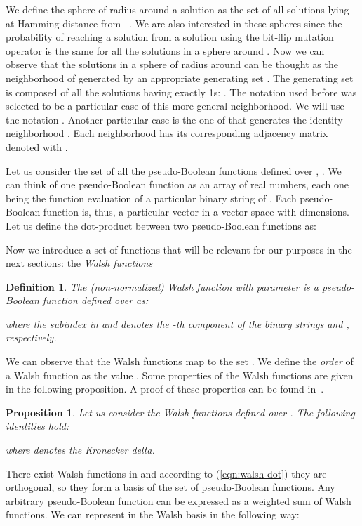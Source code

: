 \documentclass{article}
\newtheorem{definition}{Definition}
\newtheorem{proposition}{Proposition}
\begin{document}
We define the sphere of radius   around a solution  as the set of all solutions lying at Hamming distance  from ~\citep{Sutton2010}. We are also interested in these spheres since the probability of reaching a solution  from a solution  using the bit-flip mutation operator is the same for all the solutions in a sphere around . Now we can observe that the solutions in a sphere of radius  around  can be thought as the neighborhood  of  generated by an appropriate generating set . The generating set is composed of all the solutions having exactly  1s: . The notation  used before was selected to be a particular case of this more general neighborhood. We will use the notation . Another particular case is the one of  that generates the identity neighborhood . Each neighborhood has its corresponding adjacency matrix denoted with .



Let us consider the set of all the pseudo-Boolean functions defined over , . We can think of one pseudo-Boolean function as an array of  real numbers, each one being the function evaluation of a particular binary string of . Each pseudo-Boolean function is, thus, a particular vector in a vector space with  dimensions. Let us define the dot-product between two pseudo-Boolean functions as:


Now we introduce a set of functions that will be relevant for our purposes in the next sections: the \emph{Walsh functions}~\citep{Walsh1923}

\begin{definition}
The (non-normalized) Walsh function with parameter  is a pseudo-Boolean function defined over  as:

where the subindex in  and  denotes the -th component of the binary strings  and , respectively.
\end{definition}

We can observe that the Walsh functions map  to the set . We define the \emph{order} of a Walsh function  as the value . Some properties of the Walsh functions are given in the following proposition. A proof of these properties can be found in~\cite{Vose1999}.

\begin{proposition}
Let us consider the Walsh functions defined over . The following identities hold:

where  denotes the Kronecker delta.
\end{proposition}


There exist  Walsh functions in  and according to (\ref{eqn:walsh-dot}) they are orthogonal, so they form a basis of the set of pseudo-Boolean functions. Any arbitrary pseudo-Boolean function  can be expressed as a weighted sum of Walsh functions. We can represent  in the Walsh basis in the following way:
\end{document}
